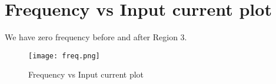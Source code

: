 \documentclass{article}
\begin{document}
\newpage
\section{Frequency vs Input current plot}
We have zero frequency before and after Region 3.

 \begin{figure}[h]
 \centering
\texttt{[image: freq.png]}
\caption{Frequency vs Input current plot}

\end{figure}







\end{document}
